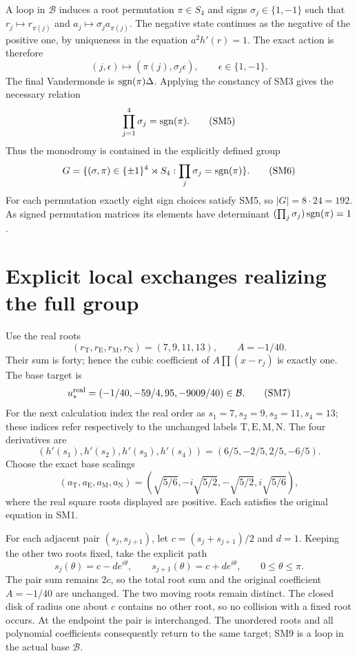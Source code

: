 A loop in $\mathcal B$ induces a root permutation $\pi\in S_4$
and signs $\sigma_j\in\{1,-1\}$ such that
$r_j\mapsto r_{\pi(j)}$ and $a_j\mapsto\sigma_j a_{\pi(j)}$.
The negative state continues as the negative of the positive one,
by uniqueness in the equation $a^2h'(r)=1$. The exact action is
therefore
\begin{equation}
 (j,\epsilon)\longmapsto(\pi(j),\sigma_j\epsilon),
 \qquad \epsilon\in\{1,-1\}.\tag{SM4}
\end{equation}
The final Vandermonde is $\operatorname{sgn}(\pi)\Delta$. Applying the
constancy of SM3 gives the necessary relation
\begin{equation}
 \prod_{j=1}^4\sigma_j=\operatorname{sgn}(\pi).\tag{SM5}
\end{equation}
Thus the monodromy is contained in the explicitly defined group
\begin{equation}
 G=\{(\sigma,\pi)\in\{\pm1\}^4\rtimes S_4:
                       \prod_j\sigma_j=\operatorname{sgn}(\pi)\}.
 \tag{SM6}
\end{equation}
For each permutation exactly eight sign choices satisfy SM5, so
$|G|=8\cdot24=192$. As signed permutation matrices its elements
have determinant $(\prod_j\sigma_j)\operatorname{sgn}(\pi)=1$.

\section{Explicit local exchanges realizing the full group}
Use the real roots
\[
 (r_{\mathrm T},r_{\mathrm E},r_{\mathrm M},r_{\mathrm N})
 =(7,9,11,13),\qquad A=-1/40.
\]
Their sum is forty; hence the cubic coefficient of
$A\prod(x-r_j)$ is exactly one. The base target is
\begin{equation}
 u_*^{\rm real}=(-1/40,-59/4,95,-9009/40)\in\mathcal B.
 \tag{SM7}
\end{equation}
For the next calculation index the real order as
$s_1=7,s_2=9,s_3=11,s_4=13$; these indices refer respectively
to the unchanged labels $\mathrm T,\mathrm E,\mathrm M,\mathrm N$.
The four derivatives are
\[
 (h'(s_1),h'(s_2),h'(s_3),h'(s_4))
       =(6/5,-2/5,2/5,-6/5).
\]
Choose the exact base scalings
\begin{equation}
 (a_{\mathrm T},a_{\mathrm E},a_{\mathrm M},a_{\mathrm N})
 =\left(\sqrt{5/6},-i\sqrt{5/2},-\sqrt{5/2},i\sqrt{5/6}\right),
 \tag{SM8}
\end{equation}
where the real square roots displayed are positive. Each satisfies
the original equation in SM1.

For each adjacent pair $(s_j,s_{j+1})$, let
$c=(s_j+s_{j+1})/2$ and $d=1$. Keeping the other two roots fixed,
take the explicit path
\begin{equation}
 s_j(\theta)=c-d e^{i\theta},\qquad
 s_{j+1}(\theta)=c+d e^{i\theta},\qquad0\le\theta\le\pi.
 \tag{SM9}
\end{equation}
The pair sum remains $2c$, so the total root sum and the original
coefficient $A=-1/40$ are unchanged. The two moving roots remain
distinct. The closed disk of radius one about $c$ contains no
other root, so no collision with a fixed root occurs. At the
endpoint the pair is interchanged. The unordered roots and all
polynomial coefficients consequently return to the same target;
SM9 is a loop in the actual base $\mathcal B$.

